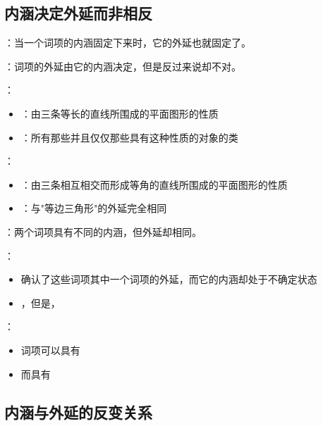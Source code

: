 \subsection{内涵决定外延而非相反}

\begin{theorembox}[title=内涵与外延的决定关系]
：当一个词项的内涵固定下来时，它的外延也就固定了。

：词项的外延由它的内涵决定，但是反过来说却不对。
\end{theorembox}

\begin{examplebox}[title=等边三角形与等角三角形的对比分析]
：
\begin{itemize}
  \item {}：由三条等长的直线所围成的平面图形的性质
  \item {}：所有那些并且仅仅那些具有这种性质的对象的类
\end{itemize}

：
\begin{itemize}
  \item {}：由三条相互相交而形成等角的直线所围成的平面图形的性质
  \item {}：与"等边三角形"的外延完全相同
\end{itemize}

：两个词项具有不同的内涵，但外延却相同。
\end{examplebox}

\begin{theorembox}[title=决定关系的逻辑分析]
：
\begin{itemize}
  \item 确认了这些词项其中一个词项的外延，而它的内涵却处于不确定状态
  \item {}，但是，
\end{itemize}

：
\begin{itemize}
  \item 词项可以具有
  \item 而具有
\end{itemize}
\end{theorembox}

\subsection{内涵与外延的反变关系}

